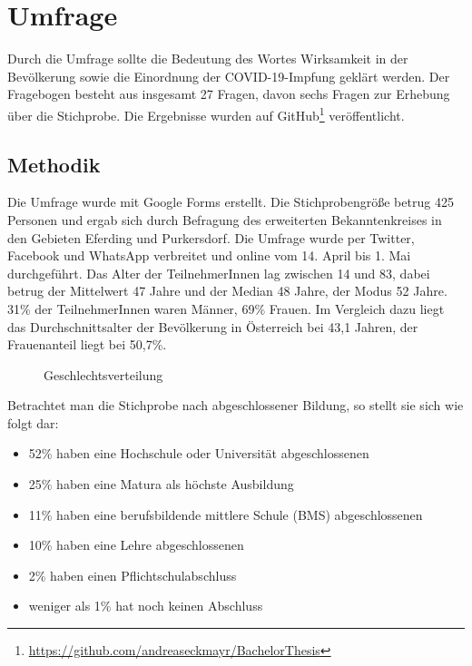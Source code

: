 \chapter{Umfrage}
\label{cha:umfrage}

Durch die Umfrage sollte die Bedeutung des Wortes Wirksamkeit in der Bevölkerung sowie die Einordnung der COVID-19-Impfung geklärt werden. Der Fragebogen besteht aus insgesamt 27 Fragen, davon sechs Fragen zur Erhebung über die Stichprobe. Die Ergebnisse wurden auf GitHub\footnote{\hyperlink{https://github.com/andreaseckmayr/BachelorThesis/blob/main/survey/Fragebogen\%20-\%20Wirksamkeit\%20d.\%20Covid-19\%20Impfung\%20(Responses)\%20-\%20Form\%20responses\%201.csv}{https://github.com/andreaseckmayr/BachelorThesis}} veröffentlicht.

\section{Methodik}

Die Umfrage wurde mit Google Forms erstellt. Die Stichprobengröße betrug 425 Personen und ergab sich durch Befragung des erweiterten Bekanntenkreises in den Gebieten Eferding und Purkersdorf. Die Umfrage wurde per Twitter, Facebook und WhatsApp verbreitet und online vom 14. April bis 1. Mai durchgeführt.
Das Alter der TeilnehmerInnen lag zwischen 14 und 83, dabei betrug der Mittelwert 47 Jahre und der Median 48 Jahre, der Modus 52 Jahre. 31\% der TeilnehmerInnen waren Männer, 69\% Frauen.
Im Vergleich dazu liegt das Durchschnittsalter der Bevölkerung in Österreich bei 43,1 Jahren, der Frauenanteil liegt bei 50,7\%.

\begin{figure}[hp]
    \centering
    \caption{Geschlechtsverteilung}
\end{figure}

\newpage

Betrachtet man die Stichprobe nach abgeschlossener Bildung, so stellt sie sich wie folgt dar:
\begin{itemize}
    \item 52\% haben eine Hochschule oder Universität abgeschlossenen
    \item 25\% haben eine Matura als höchste Ausbildung
    \item 11\% haben eine berufsbildende mittlere Schule (BMS) abgeschlossenen
    \item 10\% haben eine Lehre abgeschlossenen
    \item 2\% haben einen Pflichtschulabschluss
    \item weniger als 1\% hat noch keinen Abschluss
\end{itemize}

